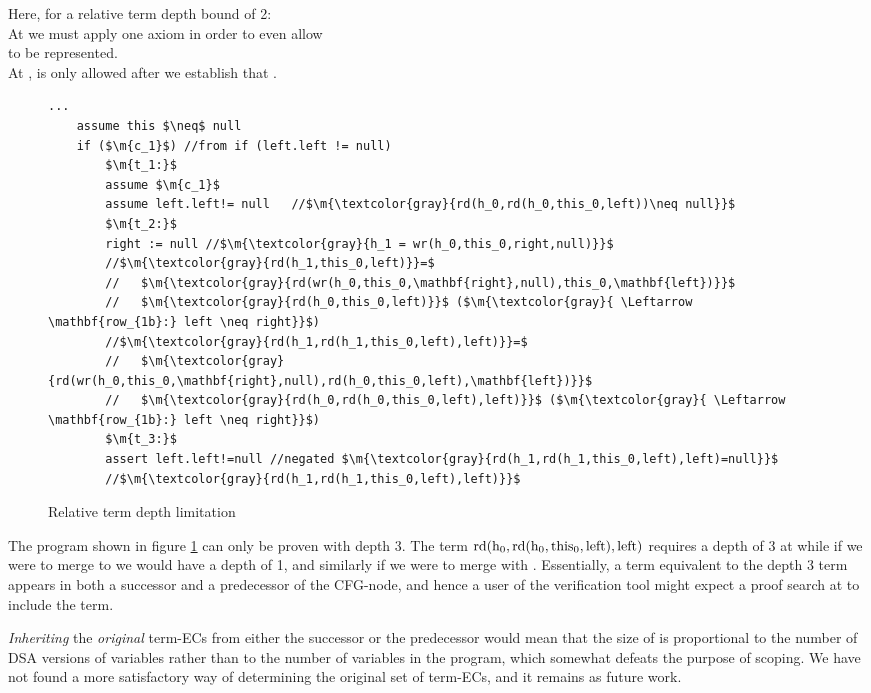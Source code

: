 Here, for a relative term depth bound of 2:\\
At  we must apply one axiom in order to even allow \\
 to be represented.\\
At ,  is only allowed after we establish that .

\begin{figure}
\begin{lstlisting}[tabsize=1]
	...
	assume this $\neq$ null
	if ($\m{c_1}$) //from if (left.left != null)
		$\m{t_1:}$
		assume $\m{c_1}$
		assume left.left!= null   //$\m{\textcolor{gray}{rd(h_0,rd(h_0,this_0,left))\neq null}}$
		$\m{t_2:}$
		right := null //$\m{\textcolor{gray}{h_1 = wr(h_0,this_0,right,null)}}$
		//$\m{\textcolor{gray}{rd(h_1,this_0,left)}}=$
		//   $\m{\textcolor{gray}{rd(wr(h_0,this_0,\mathbf{right},null),this_0,\mathbf{left})}}$
		//   $\m{\textcolor{gray}{rd(h_0,this_0,left)}}$ ($\m{\textcolor{gray}{ \Leftarrow \mathbf{row_{1b}:} left \neq right}}$)
		//$\m{\textcolor{gray}{rd(h_1,rd(h_1,this_0,left),left)}}=$
		//   $\m{\textcolor{gray}{rd(wr(h_0,this_0,\mathbf{right},null),rd(h_0,this_0,left),\mathbf{left})}}$
		//   $\m{\textcolor{gray}{rd(h_0,rd(h_0,this_0,left),left)}}$ ($\m{\textcolor{gray}{ \Leftarrow \mathbf{row_{1b}:} left \neq right}}$)
		$\m{t_3:}$
		assert left.left!=null //negated $\m{\textcolor{gray}{rd(h_1,rd(h_1,this_0,left),left)=null}}$
		//$\m{\textcolor{gray}{rd(h_1,rd(h_1,this_0,left),left)}}$
\end{lstlisting}
\caption{Relative term depth limitation}
\label{snippet4.4}
\end{figure}

The program shown in figure \ref{snippet4.4} can only be proven with depth 3.
The term $\mathrm{rd(h_0,rd(h_0,this_0,left),left)}$ requires a depth of 3 at 
while if we were to merge  to  we would have a depth of 1, and similarly if we were to merge  with .
Essentially, a term equivalent to the depth 3 term appears in both a successor and a predecessor of the CFG-node, and hence a user of the verification tool might expect a proof search at  to include the term.

\emph{Inheriting} the \emph{original} term-ECs from either the successor or the predecessor would mean that the size of  is proportional to the number of DSA versions of variables rather than to the number of variables in the program, which somewhat defeats the purpose of scoping. We have not found a more satisfactory way of determining the original set of term-ECs, and it remains as future work.

